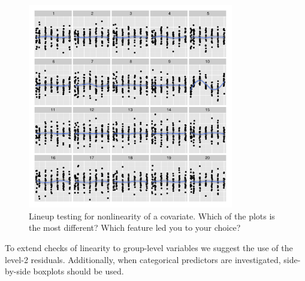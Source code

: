 \documentclass[12pt]{article} %
\newcommand{\alnote}[1]{\todo[inline,color=green!40]{#1}} %
\begin{document}
\begin{figure}
	\centering
	\includegraphics[width=0.8\textwidth]{dialyzernonlinear-10.pdf}
	\caption{\label{fig:linearity} Lineup testing  for nonlinearity of a covariate. Which of the plots is the most different? Which feature led you to your choice?}

\end{figure}

To extend checks of linearity to group-level variables we suggest the use of the level-2 residuals. Additionally, when categorical predictors are investigated, side-by-side boxplots should be used.
\end{document}
